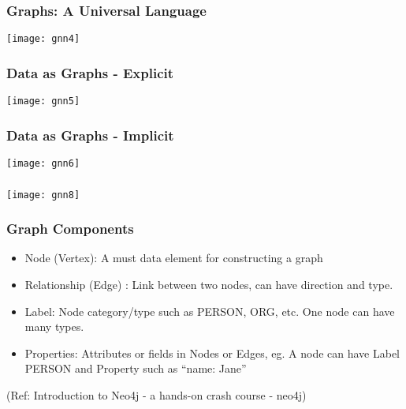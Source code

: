 \begin{frame}[fragile]\frametitle{Graphs: A Universal Language }

\begin{center}
\texttt{[image: gnn4]}
\end{center}	  

\end{frame}


\begin{frame}[fragile]\frametitle{Data as Graphs - Explicit }

\begin{center}
\texttt{[image: gnn5]}
\end{center}	  

\end{frame}

\begin{frame}[fragile]\frametitle{Data as Graphs - Implicit }

\begin{center}
\texttt{[image: gnn6]}
\end{center}	  

\end{frame}



\begin{frame}[fragile]\frametitle{}

\begin{center}
\texttt{[image: gnn8]}
\end{center}	  

\end{frame}


\begin{frame}\frametitle{Graph Components}

\begin{itemize}
\item Node (Vertex): A must data element for constructing a graph
\item Relationship (Edge) : Link between two nodes, can have direction and type.
\item Label: Node category/type such as PERSON, ORG, etc. One node can have many types.
\item Properties: Attributes or fields in Nodes or Edges, eg. A node can have Label PERSON and Property such as ``name: Jane''
\end{itemize}



{\tiny (Ref: Introduction to Neo4j - a hands-on crash course - neo4j)}
\end{frame}





